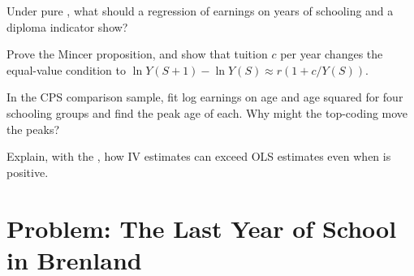 \begin{exercise}[$\star\star$]\label{exo:b3:human-capital:9}
Under pure , what should a regression of earnings on years of
schooling and a diploma indicator show?
\end{exercise}

\begin{exercise}[$\star\star\star$]\label{exo:b3:human-capital:10}
Prove the Mincer proposition, and show that tuition $c$ per year changes the equal-value
condition to $\ln Y(S+1) - \ln Y(S) \approx r(1 + c/Y(S))$.
\end{exercise}

\begin{exercise}[$\star\star\star$]\label{exo:b3:human-capital:11}
In the CPS comparison sample, fit log earnings on age and age squared for four
schooling groups and find the peak age of each. Why might the top-coding move the
peaks?
\end{exercise}

\begin{exercise}[$\star\star\star$]\label{exo:b3:human-capital:12}
Explain, with the , how IV estimates can exceed OLS
estimates even when  is positive.
\end{exercise}

\section{Problem: The Last Year of School in Brenland}\label{sec:b3:human-capital:problem}

